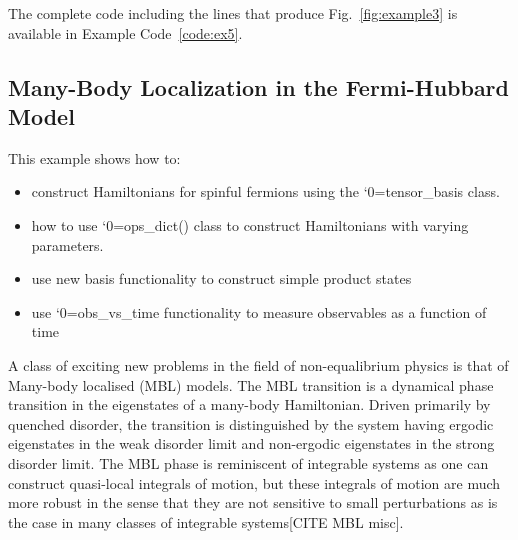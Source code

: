 \documentclass{SciPost}
\newcommand\0{\scalebox{-1}[1]{0}}
\let\svttfamily\ttfamily
\renewcommand\ttfamily{\svttfamily\catcode`0=\active }
\renewcommand\texttt{\bgroup\ttfamily\texttthelp}
\def\texttthelp#1{#1\egroup}
\begin{document}
The complete code including the lines that produce Fig.~\ref{fig:example3} is available in Example Code~\ref{code:ex5}.







\subsection{Many-Body Localization in the Fermi-Hubbard Model}
\label{subsec:Fermion_MBL}

This example shows how to:
\begin{itemize}
	\item construct Hamiltonians for spinful fermions using the \texttt{tensor\_basis} class.
	\item how to use \texttt{ops\_dict()} class to construct Hamiltonians with varying parameters.
	\item use new basis functionality to construct simple product states
	\item use \texttt{obs\_vs\_time} functionality to measure observables as a function of time
\end{itemize}

A class of exciting new problems in the field of non-equalibrium physics is that of Many-body localised (MBL) models. The MBL transition is a dynamical phase transition in the eigenstates of a many-body Hamiltonian. Driven primarily by quenched disorder, the transition is distinguished by the system having ergodic eigenstates in the weak disorder limit and non-ergodic eigenstates in the strong disorder limit. The MBL phase is reminiscent of integrable systems as one can construct quasi-local integrals of motion, but these integrals of motion are much more robust in the sense that they are not sensitive to small perturbations as is the case in many classes of integrable systems[CITE MBL misc].
\end{document}
